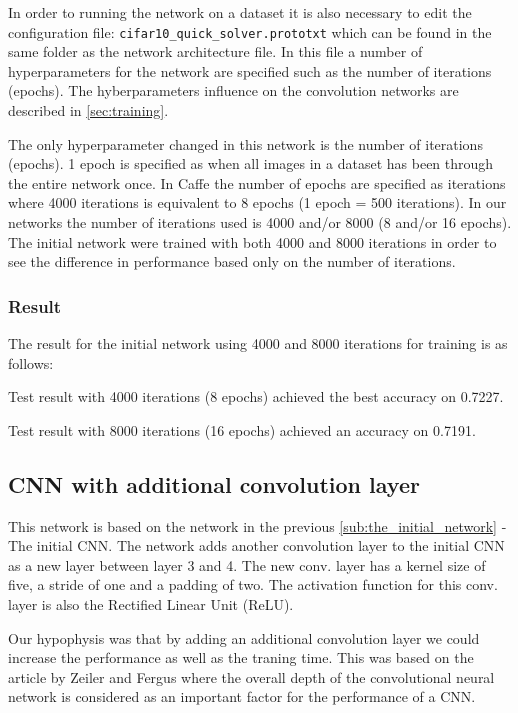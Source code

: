In order to running the network on a dataset it is also necessary to edit the
configuration file: \verb|cifar10_quick_solver.prototxt| which can be found in
the same folder as the network architecture file. In this file a number of
hyperparameters for the network are specified such as the number of iterations
(epochs). The hyberparameters influence
on the convolution networks are described in \autoref{sec:training}.


The only hyperparameter changed in this network is the number of
iterations (epochs). 1 epoch is specified as when all images in a dataset has
been through the entire network once. In Caffe the number of epochs are
specified as iterations where 4000 iterations is equivalent to 8 epochs (1
epoch = 500 iterations).
In our networks the number of iterations used is 4000 and/or 8000 (8 and/or 16
epochs). The initial network were trained with both 4000 and 8000 iterations in
order to see the difference in performance based only on the number of
iterations.


\subsubsection{Result}

The result for the initial network using 4000 and 8000 iterations for training
is as follows: 

Test result with 4000 iterations (8 epochs) achieved the best accuracy on
0.7227.

Test result with 8000 iterations (16 epochs) achieved an accuracy on 0.7191. 



\subsection{CNN with additional convolution layer} %
\label{sub:cnn}

This network is based on the network in the previous
\autoref{sub:the_initial_network} - The initial CNN. The network adds another
convolution layer to the initial CNN as a new layer between layer 3 and 4. The
new conv. layer has a kernel size of five, a stride of one and a padding of two.
The activation function for this conv. layer is also the Rectified Linear Unit
(ReLU). 

Our hypophysis was that by adding an additional convolution layer we could
increase the performance as well as the traning time. This was based on the
article by Zeiler and Fergus\cite{ZeilerFergus} where the overall depth of the
convolutional neural network is considered as an important factor for the
performance of a CNN.


